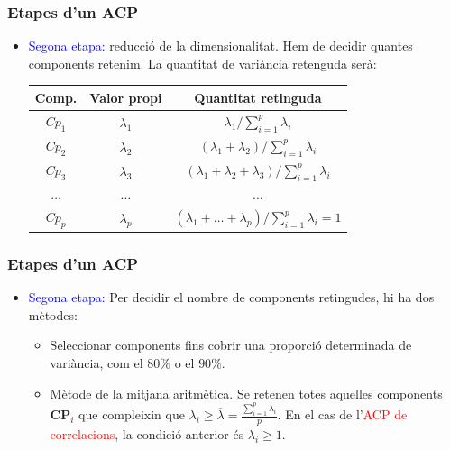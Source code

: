 \documentclass[12pt,t]{beamer}
\newcommand{\red}[1]{\textcolor{red}{#1}}
\newcommand{\blue}[1]{\textcolor{blue}{#1}}
\renewcommand{\geq}{\geqslant}
\theoremstyle{plain}
\theoremstyle{definition}
\begin{document}
\begin{frame}
\frametitle{Etapes d'un ACP}
\begin{itemize}
\item \blue{Segona etapa:} reducció de la dimensionalitat. Hem de decidir quantes components retenim. La quantitat de variància retenguda serà:
\begin{center}
\begin{tabular}{|c|c|c|}\hline
Comp. & Valor propi & Quantitat retinguda\\\hline
$Cp_1$  & $\lambda_1$ & $\lambda_1/\sum_{i=1}^p \lambda_i$\\
$Cp_2 $ & $\lambda_2$ & $(\lambda_1+\lambda_2)/\sum_{i=1}^p \lambda_i$\\
$Cp_3$ & $\lambda_3$ &
$(\lambda_1+\lambda_2+\lambda_3)/\sum_{i=1}^p
\lambda_i$\\ $\ldots$ & $\ldots$ & $\ldots$\\
$Cp_p$ & $\lambda_p$ &
$(\lambda_1+\ldots+\lambda_p)/\sum_{i=1}^p \lambda_i=1$\\\hline
\end{tabular}
\end{center}
\end{itemize}
\end{frame}


\begin{frame}
\frametitle{Etapes d'un ACP}
\begin{itemize}
\item \blue{Segona etapa:} Per decidir el  nombre de components retingudes, hi ha dos mètodes:
\begin{itemize}
\item Seleccionar components fins cobrir una proporció determinada de variància, com el $80\%$ o el $90\%$. 
\item Mètode de la mitjana aritmètica. Se retenen totes aquelles components $\mathbf{CP}_i$ que compleixin que $\lambda_i \geq \overline{\lambda}=\frac{\sum_{i=1}^p \lambda_i}{p}$. En el cas de l'\red{ACP de correlacions}, la condició anterior és $\lambda_i\geq 1$.
\end{itemize}
\end{itemize}
\end{frame}
\end{document}
